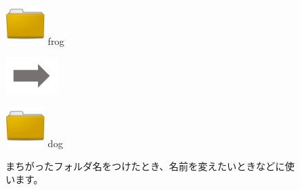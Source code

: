 \begin{figure}[ht]

  \centering
  \begin{minipage}{1.978cm}
    \includegraphics[width=1.5cm]{text01-img/textbook-img044.png}
    frog
  \end{minipage}
  \includegraphics[width=2cm]{text01-img/textbook-img052.png}
  \begin{minipage}{1.978cm}
    \includegraphics[width=1.5cm]{text01-img/textbook-img044.png}
    dog
  \end{minipage}
  \begin{minipage}{6.319cm}
    まちがったフォルダ名をつけたとき、名前を変えたいときなどに使います。
  \end{minipage}


\end{figure}
